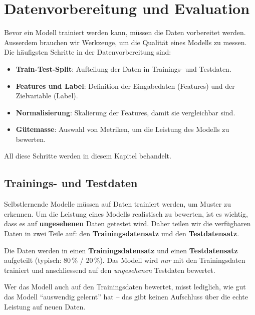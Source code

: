 \chapter{Datenvorbereitung und Evaluation}
\label{chap:datenvorbereitung}

Bevor ein Modell trainiert werden kann, müssen die Daten vorbereitet werden. Ausserdem brauchen wir Werkzeuge, um die Qualität eines Modells zu messen. Die häufigsten Schritte in der Datenvorbereitung sind:

\begin{itemize}
    \item \textbf{Train-Test-Split}: Aufteilung der Daten in Trainings- und Testdaten.
    \item \textbf{Features und Label}: Definition der Eingabedaten (Features) und der Zielvariable (Label).
    \item \textbf{Normalisierung}: Skalierung der Features, damit sie vergleichbar sind.
    \item \textbf{Gütemasse}: Auswahl von Metriken, um die Leistung des Modells zu bewerten.
\end{itemize}

All diese Schritte werden in diesem Kapitel behandelt. 

\section{Trainings- und Testdaten}

Selbstlernende Modelle müssen auf Daten trainiert werden, um Muster zu erkennen. Um die Leistung eines Modells realistisch zu bewerten, ist es wichtig, dass es auf \textbf{ungesehenen} Daten getestet wird. Daher teilen wir die verfügbaren Daten in zwei Teile auf: den \textbf{Trainingsdatensatz} und den \textbf{Testdatensatz}.

\begin{mydefinition}
Die Daten werden in einen \textbf{Trainings\-datensatz} und einen
\textbf{Testdatensatz} aufgeteilt (typisch: 80\,\% / 20\,\%).
Das Modell wird \emph{nur} mit den Trainingsdaten trainiert und
anschliessend auf den \emph{ungesehenen} Testdaten bewertet.
\end{mydefinition}

\begin{mycaution}
Wer das Modell auch auf den Trainingsdaten bewertet, misst lediglich, wie gut das Modell \enquote{auswendig gelernt} hat -- das gibt keinen Aufschluss über die echte Leistung auf neuen Daten.
\end{mycaution}

